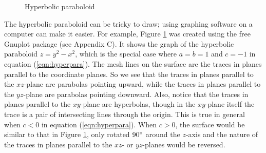 \begin{figure}[h]
 \begin{center}
  
 \end{center}\vspace{-12mm}
 \caption[]{\quad Hyperbolic paraboloid}
 \label{fig:hyperpara}
\end{figure}
\newpage
The hyperbolic paraboloid can be tricky to draw; using graphing software on a computer can make it
easier.
For example, Figure \ref{fig:hyperpara} was created using the free Gnuplot package (see Appendix C). It shows the graph
of the hyperbolic paraboloid
$z = y^2 - x^2$, which is the special case where $a = b = 1$ and $c = -1$ in equation (\ref{eqn:hyperpara}).
The mesh lines on the surface are the traces in planes parallel to the coordinate planes.
So we see that the traces in planes parallel to the $xz$-plane are parabolas pointing upward,
while the traces in planes parallel to the $yz$-plane are parabolas pointing downward. Also, notice that the traces in
planes parallel to the $xy$-plane are hyperbolas, though in the $xy$-plane itself the trace is a pair of intersecting
lines through the origin. This is true in general when $c < 0$ in equation (\ref{eqn:hyperpara}).
When $c > 0$, the surface would be similar to that
in Figure \ref{fig:hyperpara}, only rotated $90^\circ$ around the $z$-axis and the nature
of the traces in planes parallel to the $xz$- or $yz$-planes would be reversed.

